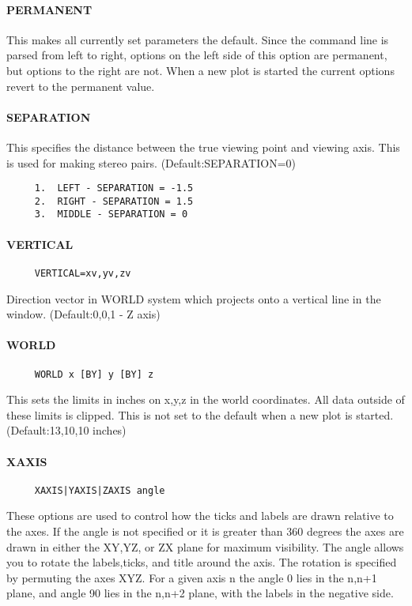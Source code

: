 \paragraph{PERMANENT}
This  makes  all  currently  set  parameters  the default.  Since the
command line is parsed from left to right, options on the  left  side
of this option are permanent, but options to the right are not.  When
a new plot is started the current options  revert  to  the  permanent
value.  
\paragraph{SEPARATION}
This  specifies  the  distance  between  the  true  viewing point and
viewing   axis.    This   is   used   for   making   stereo    pairs.
(Default:SEPARATION=0) 
\begin{verbatim}
     1.  LEFT - SEPARATION = -1.5 
     2.  RIGHT - SEPARATION = 1.5 
     3.  MIDDLE - SEPARATION = 0 
\end{verbatim}
\paragraph{VERTICAL}
\begin{verbatim}
     VERTICAL=xv,yv,zv 
\end{verbatim}
Direction  vector in WORLD system which projects onto a vertical line
in the window.  (Default:0,0,1 - Z axis) 
\paragraph{WORLD}
\begin{verbatim}
     WORLD x [BY] y [BY] z 
\end{verbatim}
This  sets  the  limits  in inches on x,y,z in the world coordinates.
All data outside of these limits is clipped.  This is not set to  the
default when a new plot is started.  (Default:13,10,10 inches) 
\paragraph{XAXIS}
\begin{verbatim}
     XAXIS|YAXIS|ZAXIS angle 
\end{verbatim}

These  options are used to control how the ticks and labels are drawn
relative to the axes.  If the angle is not specified or it is greater
than  360 degrees the axes are drawn in either the XY,YZ, or ZX plane
for  maximum  visibility.   The  angle  allows  you  to  rotate   the
labels,ticks,  and  title around the axis.  The rotation is specified
by permuting the axes XYZ.  For a given axis n the angle  0  lies  in
the  n,n+1  plane,  and  angle  90  lies in the n,n+2 plane, with the
labels in the negative side.  

